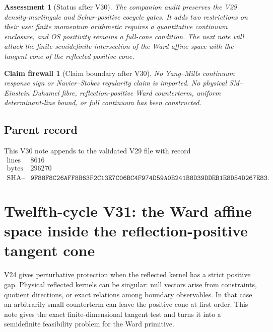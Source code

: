 \documentclass[11pt]{article}
\newtheorem{firewall}[theorem]{Claim firewall}
\newtheorem{assessment}[theorem]{Assessment}
\theoremstyle{remark}
\begin{document}
\begin{assessment}[Status after V30]
\label{ass:v12v30-status}
The companion audit preserves the V29 density-martingale and
Schur-positive cocycle gates.  It adds two restrictions on their
use: finite momentum arithmetic requires a quantitative continuum
enclosure, and OS positivity remains a full-cone condition.  The
next note will attack the finite semidefinite intersection of the
Ward affine space with the tangent cone of the reflected positive
cone.
\end{assessment}

\begin{firewall}[Claim boundary after V30]
\label{fire:v12v30-claim}
No Yang--Mills continuum response sign or Navier--Stokes regularity
claim is imported.  No physical SM--Einstein Duhamel fibre,
reflection-positive Ward counterterm, uniform determinant-line
bound, or full continuum has been constructed.
\end{firewall}

\subsection{Parent record}

This V30 note appends to the validated V29 file with record
\[
\begin{array}{c|c}
\text{lines}&8616\\
\text{bytes}&296270\\
\text{SHA--256}&
\texttt{9F88F8C26AFF8B63F2C13E7C06BC4F974D59A0B241B8D39DDEB1E8D54D267E83}.
\end{array}
\]


\section{Twelfth-cycle V31: the Ward affine space inside the
reflection-positive tangent cone}
\label{sec:v12v31}

V24 gives perturbative protection when the reflected kernel has a
strict positive gap.  Physical reflected kernels can be singular:
null vectors arise from constraints, quotient directions, or exact
relations among boundary observables.  In that case an arbitrarily
small counterterm can leave the positive cone at first order.  This
note gives the exact finite-dimensional tangent test and turns it
into a semidefinite feasibility problem for the Ward primitive.
\end{document}
